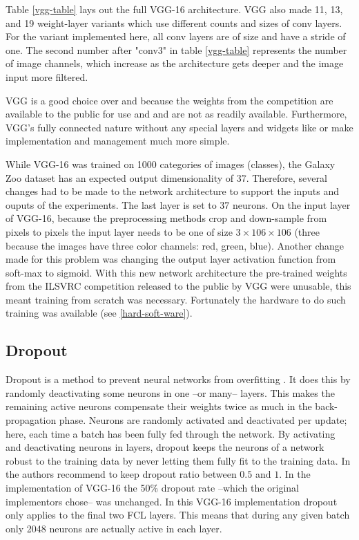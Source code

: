 Table \ref{vgg-table} lays out the full VGG-16 architecture. VGG also made 11, 13, and 19 weight-layer variants which use different counts and sizes of conv layers. For the variant implemented here, all conv layers are of size  and have a stride of one. The second number after "conv3" in table \ref{vgg-table} represents the number of image channels, which increase as the architecture gets deeper and the image input more filtered.

VGG is a good choice over \gnet and \anet because the weights from the competition are available to the public for use and \anet and \gnet are not as readily available. Furthermore, VGG's fully connected nature without any special layers and widgets like \anet or \gnet make implementation and management much more simple. %

While VGG-16 was trained on 1000 categories of images (classes), the Galaxy Zoo dataset has an expected output dimensionality of 37. Therefore, several changes had to be made to the network architecture to support the inputs and ouputs of the experiments. The last layer is set to 37 neurons. On the input layer of VGG-16, because the preprocessing methods crop and down-sample from  pixels to  pixels the input layer needs to be one of size $3 \times 106 \times 106$ (three because the images have three color channels: red, green, blue). Another change made for this problem was changing the output layer activation function from soft-max to sigmoid. With this new network architecture the pre-trained weights from the ILSVRC competition released to the public by VGG were unusable, this meant training from scratch was necessary. Fortunately the hardware to do such training was available (see \ref{hard-soft-ware}).

\subsection{Dropout}
Dropout is a method to prevent neural networks from overfitting \cite{dropout}. It does this by randomly deactivating some neurons in one --or many-- layers. This makes the remaining active neurons compensate their weights twice as much in the back-propagation phase. Neurons are randomly activated and deactivated per update; here, each time a batch has been fully fed through the network. By activating and deactivating neurons in layers, dropout keeps the neurons of a network robust to the training data by never letting them fully fit to the training data. In \cite{dropout} the authors recommend to keep dropout ratio between $0.5$ and $1$. In the implementation of VGG-16 the 50\% dropout rate --which the original implementors chose-- was unchanged. In this VGG-16 implementation dropout only applies to the final two FCL layers. This means that during any given batch only 2048 neurons are actually active in each layer.

